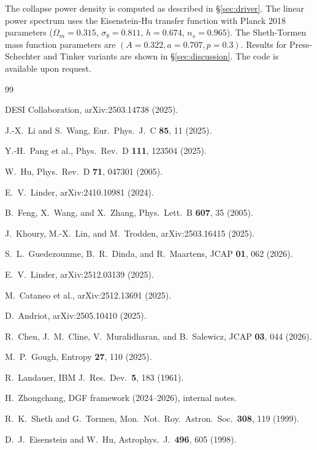 \documentclass[aps,prd,twocolumn,superscriptaddress]{revtex4-2}
\begin{document}
The collapse power density is computed as described in \S\ref{sec:driver}. The linear power spectrum uses the Eisenstein-Hu transfer function with Planck 2018 parameters ($\Omega_m=0.315$, $\sigma_8=0.811$, $h=0.674$, $n_s=0.965$). The Sheth-Tormen mass function parameters are $(A=0.322, a=0.707, p=0.3)$. Results for Press-Schechter and Tinker variants are shown in \S\ref{sec:discussion}. The code is available upon request.

\begin{thebibliography}{99}

DESI Collaboration, arXiv:2503.14738 (2025).

J.-X.~Li and S.~Wang, Eur.\ Phys.\ J.\ C \textbf{85}, 11 (2025).

Y.-H.~Pang et al., Phys.\ Rev.\ D \textbf{111}, 123504 (2025).

W.~Hu, Phys.\ Rev.\ D \textbf{71}, 047301 (2005).

E.~V.~Linder, arXiv:2410.10981 (2024).

B.~Feng, X.~Wang, and X.~Zhang, Phys.\ Lett.\ B \textbf{607}, 35 (2005).

J.~Khoury, M.-X.~Lin, and M.~Trodden, arXiv:2503.16415 (2025).

S.~L.~Guedezounme, B.~R.~Dinda, and R.~Maartens, JCAP \textbf{01}, 062 (2026).

E.~V.~Linder, arXiv:2512.03139 (2025).

M.~Cataneo et al., arXiv:2512.13691 (2025).

D.~Andriot, arXiv:2505.10410 (2025).

R.~Chen, J.~M.~Cline, V.~Muralidharan, and B.~Salewicz, JCAP \textbf{03}, 044 (2026).

M.~P.~Gough, Entropy \textbf{27}, 110 (2025).

R.~Landauer, IBM J.\ Res.\ Dev.\ \textbf{5}, 183 (1961).

H.~Zhongchang, DGF framework (2024--2026), internal notes.

R.~K.~Sheth and G.~Tormen, Mon.\ Not.\ Roy.\ Astron.\ Soc.\ \textbf{308}, 119 (1999).

D.~J.~Eisenstein and W.~Hu, Astrophys.\ J.\ \textbf{496}, 605 (1998).


\end{thebibliography}
\end{document}
